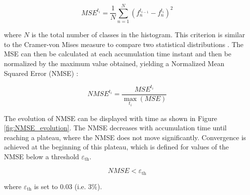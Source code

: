\begin{equation}
MSE^{t_i} = \frac{1}{N} \sum_{n=1}^N \left( f_n^{t_{i-1}} - f_n^{t_i}  \right)^2
\end{equation}

where $N$ is the total number of classes in the histogram. This criterion is similar to the Cramer-von Mises measure to compare two statistical distributions . The MSE can then be calculated at each accumulation time instant and then be normalized by the maximum value obtained, yielding a Normalized Mean Squared Error (NMSE) :

\begin{equation}
NMSE^{t_i} = \frac{MSE^{t_i}}{\max_{t_i} \left( MSE \right)}
\end{equation}

The evolution of NMSE can be displayed with time as shown in Figure \ref{fig:NMSE_evolution}. The NMSE decreases with accumulation time until reaching a plateau, where the NMSE does not move significantly. Convergence is achieved at the beginning of this plateau, which is defined for values of the NMSE below a threshold $\varepsilon_\mathrm{th}$.

\begin{equation}
\label{eq:NMSE_convergence_criterion}
NMSE < \varepsilon_\mathrm{th}
\end{equation}

where $\varepsilon_\mathrm{th}$ is set to $0.03$ (i.e. $3 \%$).

%
%
%	
%


